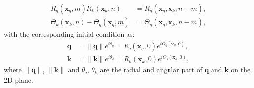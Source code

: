 \documentclass{article}
\def\q{{\boldsymbol q}}
\def\k{{\boldsymbol k}}
\def\x{{\boldsymbol x}}
\begin{document}
\begin{equation}
	\begin{aligned}
		R_q(\x_q, m)R_k(\x_k, n) &= R_g(\x_q, \x_k, n - m), \\
		\Theta_k(\x_k, n) - \Theta_q(\x_q, m) &= \Theta_g(\x_q, \x_k, n - m),
	\end{aligned}
	\label{fn:deri-rtheta}
\end{equation}
with the corresponding initial condition as: 
\begin{equation}
	\begin{aligned}
		\q &= \|\q\|e^{i\theta_q} = R_q(\x_q, 0)e^{i\Theta_q(\x_q, 0)},\\
		\k & = \|\k\|e^{i\theta_k} = R_k(\x_k, 0)e^{i\Theta_k(\x_k, 0)},
	\end{aligned}
	\label{fn:deri-initCond2}
\end{equation}
where $\|\q\|$, $\|\k\|$ and $\theta_q$, $\theta_k$ are the radial and angular part of $\q$ and $\k$ on the 2D plane.
\end{document}

